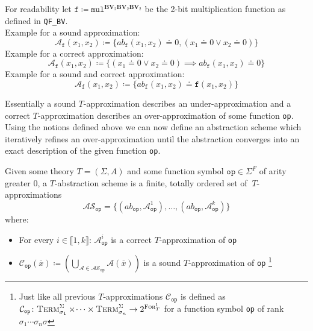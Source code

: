\begin{example}
For readability let $\texttt{f} \coloneqq \texttt{mul}^{\mathbf{BV}_2\mathbf{BV}_2\mathbf{BV}_2}$ be the 2-bit multiplication function as defined in \texttt{QF\_BV}.\\
Example for a sound approximation:
\[
    \mathcal{A}_\texttt{f}\left(x_1,x_2\right) 
    \coloneqq \{
    ab_\texttt{f}\left(x_1,x_2\right) \doteq 0, \left(x_1\doteq 0 \lor x_2 \doteq 0\right)
    \}
\]
Example for a correct approximation:
\[
    \mathcal{A}_\texttt{f}\left(x_1,x_2\right) 
    \coloneqq \{
    \left(x_1\doteq 0 \lor x_2 \doteq 0\right) \implies ab_\texttt{f}\left(x_1,x_2\right) \doteq 0
    \}
\]
Example for a sound and correct approximation:
\[
\mathcal{A}_\texttt{f}\left(x_1,x_2\right) 
        \coloneqq \{
        ab_\texttt{f}\left(x_1,x_2\right) \doteq \texttt{f}\left(x_1,x_2\right)
        \}
\]
\end{example}
Essentially a sound $T$-approximation describes an under-approximation and a correct $T$-approximation describes an over-approximation of some function \texttt{op}. Using the notions defined above we can now define an abstraction scheme which iteratively refines an over-approximation until the abstraction converges into an exact description of the given function \texttt{op}.
\begin{definition}
Given some theory $T=\left(\Sigma,A\right)$ and some function symbol $\texttt{op}\in\Sigma^F$ of arity greater $0$, a $T$-abstraction scheme is a finite, totally ordered set of $\ T$-approximations \[
\mathcal{AS}_{\texttt{op}} = \{ \left(ab_{\texttt{op}}, \mathcal{A}^1_{\texttt{op}}\right),\dots,\left(ab_{\texttt{op}}, \mathcal{A}^k_{\texttt{op}}\right) \}
\]
where:
\begin{itemize}
    \item For every $i\in\llbracket1,k\rrbracket$: $\mathcal{A}^i_{\texttt{op}}$ is a correct $T$-approximation of \texttt{op}
    \item $\mathcal{C}_{\texttt{op}}\left(\overline{x}\right)\coloneqq\left(\bigcup\limits_{\mathcal{A}\in\mathcal{AS}_{\texttt{op}}} \mathcal{A}\left(\overline{x}\right)\right)$ is a sound $T$-approximation of \texttt{op}
    \footnote{
        Just like all previous $T$-approximations $\mathcal{C}_{\texttt{op}}$ is defined as
        $\mathcal{C}_{\texttt{op}}\colon \textsc{Term}^\Sigma_{\sigma_1}\times\dotsi\times\textsc{Term}^\Sigma_{\sigma_n} \to 2^{\textsc{For}^1_T}$ for a function symbol \texttt{op} of rank $\sigma_1\dotsi\sigma_n\sigma$
    }
\end{itemize}
\end{definition}

